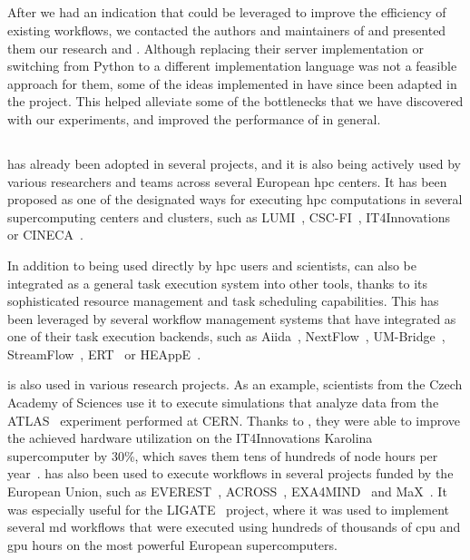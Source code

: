\subsection*{\rsds{}}
After we had an indication that \rsds{} could be leveraged to improve the
efficiency of existing \dask{} workflows, we contacted the authors and
maintainers of \dask{} and presented them our research and
\rsds{}. Although replacing their server implementation or switching from Python
to a different implementation language was not a feasible approach for them, some of the ideas
implemented in \rsds{} have since been adapted in the \dask{}
project. This helped alleviate some of the bottlenecks that we have discovered with our
experiments, and improved the performance of \dask{} in
general.

\subsection*{\hyperqueue{}}
\hyperqueue{} has already been adopted in several projects, and it is also being
actively used by various researchers and teams across several European \gls{hpc}
centers. It has been proposed as one of the designated ways for executing
\gls{hpc} computations in several supercomputing centers and clusters, such as
LUMI~\cite{it4i-lumi}, CSC-FI~\cite{puhti-hq,puhti-hq-2},
IT4Innovations~\cite{it4i-hq} or CINECA~\cite{cineca}.

In addition to being used directly by \gls{hpc} users and scientists,
\hyperqueue{} can also be integrated as a general task execution system into other
tools, thanks to its sophisticated resource management and task scheduling capabilities. This has
been leveraged by several workflow management systems that have integrated
\hyperqueue{} as one of their task execution backends, such as
Aiida~\cite{aiida-hq}, NextFlow~\cite{nextflow-hq},
UM-Bridge~\cite{umbridge}, StreamFlow~\cite{streamflow-hq},
ERT~\cite{ert} or HEAppE~\cite{heappe}.

\hyperqueue{} is also used in various research projects. As an example,
scientists from the Czech Academy of Sciences use it to execute simulations that analyze data from
the ATLAS~\cite{atlas} experiment performed at CERN. Thanks to
\hyperqueue{}, they were able to improve the achieved hardware utilization on the
IT4Innovations Karolina~\cite{karolina} supercomputer by 30\%, which saves them tens of
hundreds of node hours per year~\cite{cern-hq}. \hyperqueue{} has also
been used to execute workflows in several projects funded by the European Union, such as
EVEREST~\cite{everest}, ACROSS~\cite{across},
EXA4MIND~\cite{exa4mind} and MaX~\cite{max}. It was especially useful
for the LIGATE~\cite{ligate} project, where it was used to implement several
\gls{md} workflows that were executed using hundreds of thousands of
\gls{cpu} and \gls{gpu} hours on the most powerful European
supercomputers.


